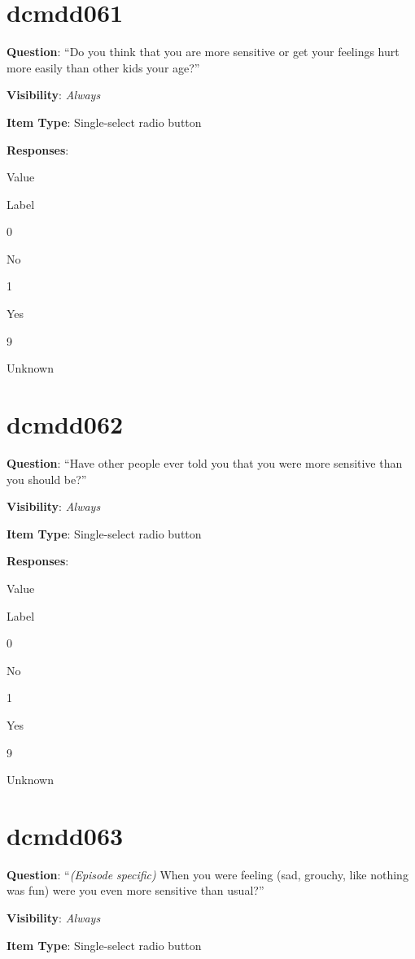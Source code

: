 \documentclass[]{book}
\begin{document}
\hypertarget{dcmdd061}{%
\section{dcmdd061}\label{dcmdd061}}

\textbf{Question}: ``Do you think that you are more sensitive or get your feelings hurt more easily than other kids your age?''

\textbf{Visibility}: \emph{Always}

\textbf{Item Type}: Single-select radio button

\textbf{Responses}:

Value

Label

0

No

1

Yes

9

Unknown

\hypertarget{dcmdd062}{%
\section{dcmdd062}\label{dcmdd062}}

\textbf{Question}: ``Have other people ever told you that you were more sensitive than you should be?''

\textbf{Visibility}: \emph{Always}

\textbf{Item Type}: Single-select radio button

\textbf{Responses}:

Value

Label

0

No

1

Yes

9

Unknown

\hypertarget{dcmdd063}{%
\section{dcmdd063}\label{dcmdd063}}

\textbf{Question}: ``\emph{(Episode specific)} When you were feeling (sad, grouchy, like nothing was fun) were you even more sensitive than usual?''

\textbf{Visibility}: \emph{Always}

\textbf{Item Type}: Single-select radio button
\end{document}
